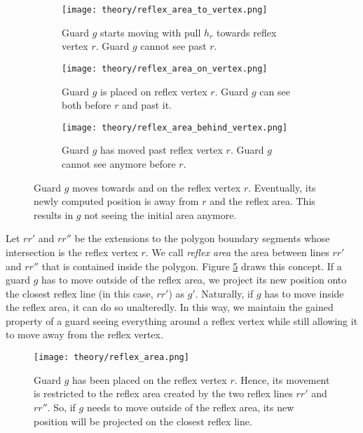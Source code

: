 \begin{figure}[h!]
    \centering
    \begin{subfigure}{0.45\textwidth}
        \texttt{[image: theory/reflex\_area\_to\_vertex.png]}
        \caption{Guard $g$ starts moving with pull $h_r$ towards reflex vertex $r$. Guard $g$ cannot see past $r$.}
        \label{fig:pull_to_on_behind1}
    \end{subfigure}
    \hfill
    \begin{subfigure}{0.45\textwidth}
        \texttt{[image: theory/reflex\_area\_on\_vertex.png]}
        \caption{Guard $g$ is placed on reflex vertex $r$. Guard $g$ can see both before $r$ and past it.}
        \label{fig:pull_to_on_behind2}
    \end{subfigure}
    \begin{subfigure}{0.6\textwidth}
        \texttt{[image: theory/reflex\_area\_behind\_vertex.png]}
        \caption{Guard $g$ has moved past reflex vertex $r$. Guard $g$ cannot see anymore before $r$.}
        \label{fig:pull_to_on_behind3}
    \end{subfigure}
    \caption{Guard $g$ moves towards and on the reflex vertex $r$. Eventually, its newly computed position is away from $r$ and the reflex area. This results in $g$ not seeing the initial area anymore.}
    \label{fig:pull_to_on_behind}
\end{figure}


Let $rr'$ and $rr''$ be the extensions to the polygon boundary segments whose intersection is the reflex vertex $r$. We call \textit{reflex area} the area between lines $rr'$ and $rr''$ that is contained inside the polygon. Figure \ref{fig:reflex_area} draws this concept. If a guard $g$ has to move outside of the reflex area, we project its new position onto the closest reflex line (in this case, $rr'$) as $g'$. Naturally, if $g$ has to move inside the reflex area, it can do so unalteredly. In this way, we maintain the gained property of a guard seeing everything around a reflex vertex while still allowing it to move away from the reflex vertex.

\begin{figure}[h!]
    \centering
    \texttt{[image: theory/reflex\_area.png]}
    \caption{Guard $g$ has been placed on the reflex vertex $r$. Hence, its movement is restricted to the reflex area created by the two reflex lines $rr'$ and $rr''$. So, if $g$ needs to move outside of the reflex area, its new position will be projected on the closest reflex line.}
    \label{fig:reflex_area}
\end{figure}


